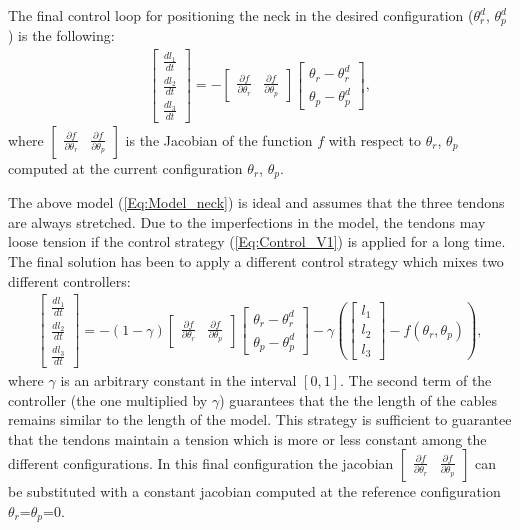 The final control loop for positioning the neck in the desired configuration ($\theta_r^d$, $\theta_p^d$) is the following:
\begin{eqnarray} \label{Eq:Control_V1}
\begin{bmatrix}
\frac{d l_1}{dt}\\
\frac{d l_2}{dt}\\
\frac{d l_3}{dt}
\end{bmatrix} = -\begin{bmatrix} \frac{\partial f} {\partial \theta_r} &  \frac{\partial f} {\partial \theta_p} \end{bmatrix}
 \begin{bmatrix}
\theta_r - \theta_r^d\\
\theta_p - \theta_p^d
\end{bmatrix},
\end{eqnarray}
where $\begin{bmatrix} \frac{\partial f} {\partial \theta_r} &  \frac{\partial f} {\partial \theta_p} \end{bmatrix}$ is the Jacobian of the function $f$ with respect to $\theta_r$, $\theta_p$ computed at the current configuration $\theta_r$, $\theta_p$. 

The above model (\ref{Eq:Model_neck}) is ideal and assumes that the three tendons are always stretched. Due to the imperfections in the model, the tendons may loose tension if the control strategy (\ref{Eq:Control_V1}) is applied for a long time. The final solution has been to apply a different control strategy which mixes two different controllers:
\begin{eqnarray} \label{Eq:Control_V2}
\begin{bmatrix}
\frac{d l_1}{dt}\\
\frac{d l_2}{dt}\\
\frac{d l_3}{dt}
\end{bmatrix} = -(1-\gamma)\begin{bmatrix} \frac{\partial f} {\partial \theta_r} &  \frac{\partial f} {\partial \theta_p} \end{bmatrix}
 \begin{bmatrix}
\theta_r - \theta_r^d\\
\theta_p - \theta_p^d
\end{bmatrix} - \gamma \left( \begin{bmatrix} l_1\\
l_2\\
l_3
\end{bmatrix} - f(\theta_r, \theta_p) \right),
\end{eqnarray}
where $\gamma$ is an arbitrary constant in the interval $[0, 1]$. The second term of the controller (the one multiplied by $\gamma$) guarantees that the the length of the cables remains similar to the length of the model. This strategy is sufficient to guarantee that the tendons maintain a tension which is more or less constant among the different configurations. In this final configuration the jacobian $\begin{bmatrix} \frac{\partial f} {\partial \theta_r} &  \frac{\partial f} {\partial \theta_p} \end{bmatrix}$ can be substituted with a constant jacobian computed at the reference configuration $\theta_r$=$\theta_p$=0.
